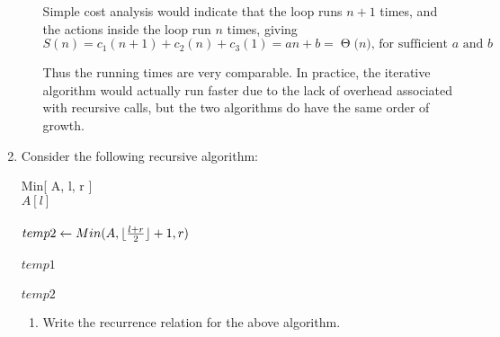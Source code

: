 \documentclass[11pts]{article}
\newcommand{\BigTheta}[1]{\ensuremath{\operatorname{\Theta}\bigl(#1\bigr)}}
\begin{document}
\begin{enumerate}
\begin{enumerate}
  Simple cost analysis would indicate that the loop runs $n + 1$ times,
  and the actions inside the loop run $n$ times, giving
  \[ S(n) = c_1(n + 1) + c_2(n) + c_3(1) = an + b = \BigTheta{n} 
      \text{, for sufficient $a$ and $b$ } \]

  Thus the running times are very comparable. In practice, the iterative
  algorithm would actually run faster due to the lack of overhead
  associated with recursive calls, but the two algorithms do have the same
  order of growth.

  \end{enumerate}

\newpage

\item Consider the following recursive algorithm:
\begin{algorithm}{Min}[ A, l, r ]{
   }
 \\
  \qreturn $A[l]$ \\
 \\
       $temp2 \mathrel{\leftarrow} Min(A, \lfloor \frac{l + r}{2} \rfloor + 1, r)$ \\
   \\
    \qreturn $temp1$ \\
  \qelse \\
    \qreturn $temp2$ \qfi \qfi 
\end{algorithm}

  \begin{enumerate}
  \item Write the recurrence relation for the above algorithm. \\


\end{enumerate}
\end{enumerate}
\end{document}
